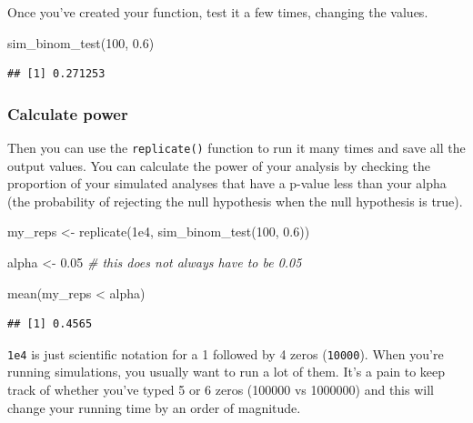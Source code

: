 \documentclass[
  oneside]{book}
\newenvironment{Shaded}{\begin{snugshade}}{\end{snugshade}}
\newcommand{\CommentTok}[1]{\textcolor[rgb]{0.56,0.35,0.01}{\textit{#1}}}
\newcommand{\DecValTok}[1]{\textcolor[rgb]{0.00,0.00,0.81}{#1}}
\newcommand{\FloatTok}[1]{\textcolor[rgb]{0.00,0.00,0.81}{#1}}
\newcommand{\FunctionTok}[1]{\textcolor[rgb]{0.00,0.00,0.00}{#1}}
\newcommand{\NormalTok}[1]{#1}
\newcommand{\OtherTok}[1]{\textcolor[rgb]{0.56,0.35,0.01}{#1}}
\newcommand{\SpecialCharTok}[1]{\textcolor[rgb]{0.00,0.00,0.00}{#1}}
\begin{document}
Once you've created your function, test it a few times, changing the values.

\begin{Shaded}
\begin{Highlighting}[]
\FunctionTok{sim\_binom\_test}\NormalTok{(}\DecValTok{100}\NormalTok{, }\FloatTok{0.6}\NormalTok{)}
\end{Highlighting}
\end{Shaded}

\begin{verbatim}
## [1] 0.271253
\end{verbatim}

\hypertarget{calc-power-binom}{%
\subsubsection{Calculate power}\label{calc-power-binom}}

Then you can use the \texttt{replicate()} function to run it many times and save all the output values. You can calculate the power of your analysis by checking the proportion of your simulated analyses that have a p-value less than your alpha (the probability of rejecting the null hypothesis when the null hypothesis is true).

\begin{Shaded}
\begin{Highlighting}[]
\NormalTok{my\_reps }\OtherTok{\textless{}{-}} \FunctionTok{replicate}\NormalTok{(}\FloatTok{1e4}\NormalTok{, }\FunctionTok{sim\_binom\_test}\NormalTok{(}\DecValTok{100}\NormalTok{, }\FloatTok{0.6}\NormalTok{))}

\NormalTok{alpha }\OtherTok{\textless{}{-}} \FloatTok{0.05} \CommentTok{\# this does not always have to be 0.05}

\FunctionTok{mean}\NormalTok{(my\_reps }\SpecialCharTok{\textless{}}\NormalTok{ alpha)}
\end{Highlighting}
\end{Shaded}

\begin{verbatim}
## [1] 0.4565
\end{verbatim}

\begin{info}
\texttt{1e4} is just scientific notation for a 1 followed by 4 zeros (\texttt{10000}). When you're running simulations, you usually want to run a lot of them. It's a pain to keep track of whether you've typed 5 or 6 zeros (100000 vs 1000000) and this will change your running time by an order of magnitude.

\end{info}
\end{document}
